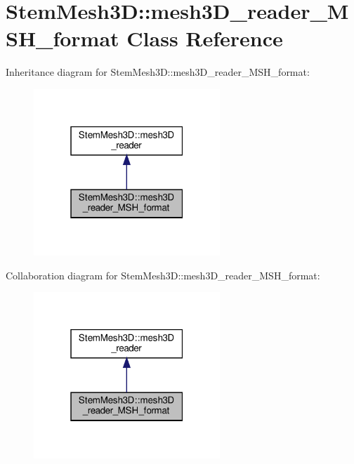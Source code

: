 \hypertarget{classStemMesh3D_1_1mesh3D__reader__MSH__format}{}\section{Stem\+Mesh3D\+:\+:mesh3\+D\+\_\+reader\+\_\+\+M\+S\+H\+\_\+format Class Reference}
\label{classStemMesh3D_1_1mesh3D__reader__MSH__format}


Inheritance diagram for Stem\+Mesh3D\+:\+:mesh3\+D\+\_\+reader\+\_\+\+M\+S\+H\+\_\+format\+:\nopagebreak
\begin{figure}[H]
\begin{center}
\leavevmode
\includegraphics[width=199pt]{classStemMesh3D_1_1mesh3D__reader__MSH__format__inherit__graph}
\end{center}
\end{figure}


Collaboration diagram for Stem\+Mesh3D\+:\+:mesh3\+D\+\_\+reader\+\_\+\+M\+S\+H\+\_\+format\+:\nopagebreak
\begin{figure}[H]
\begin{center}
\leavevmode
\includegraphics[width=199pt]{classStemMesh3D_1_1mesh3D__reader__MSH__format__coll__graph}
\end{center}
\end{figure}
